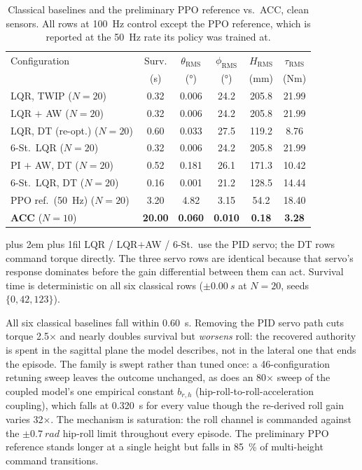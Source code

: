 \documentclass{jcd}
\newcommand{\tabnote}{\par\leftskip=0pt\rightskip=0pt plus 2em%
  \parfillskip=0pt plus 1fil\relax}
\begin{document}
\begin{table}[htbp]
\centering
\footnotesize
\caption{Classical baselines and the preliminary PPO reference vs.\ ACC, clean sensors. All rows at \SI{100}{Hz} control except the PPO reference, which is reported at the \SI{50}{Hz} rate its policy was trained at.}
\label{tab:lqr_baselines}
\setlength{\tabcolsep}{4pt}
\begin{tabular}{@{}l S[table-format=2.2] S[table-format=1.3] S[table-format=2.2] S[table-format=3.1] S[table-format=2.2]@{}}
\toprule
Configuration & {Surv.} & {$\theta_{\text{RMS}}$} & {$\phi_{\text{RMS}}$} & {$H_{\text{RMS}}$} & {$\tau_{\text{RMS}}$} \\
& {(s)} & {(\si{\degree})} & {(\si{\degree})} & {(mm)} & {(Nm)} \\
\midrule
LQR, TWIP ($N{=}20$)         & 0.32 & 0.006 & 24.2 & 205.8 & 21.99 \\
LQR $+$ AW ($N{=}20$)        & 0.32 & 0.006 & 24.2 & 205.8 & 21.99 \\
LQR, DT (re-opt.) ($N{=}20$) & 0.60 & 0.033 & 27.5 & 119.2 & 8.76 \\
6-St.\ LQR ($N{=}20$)        & 0.32 & 0.006 & 24.2 & 205.8 & 21.99 \\
PI $+$ AW, DT ($N{=}20$)     & 0.52 & 0.181 & 26.1 & 171.3 & 10.42 \\
6-St.\ LQR, DT ($N{=}20$)    & 0.16 & 0.001 & 21.2 & 128.5 & 14.44 \\
PPO ref.\ (\SI{50}{Hz}) ($N{=}20$)& 3.20 & 4.82  & 3.15 & 54.2  & 18.40 \\
\midrule
\textbf{ACC} ($N{=}10$)      & \bfseries 20.00 & \bfseries 0.060 & \bfseries 0.010 & \bfseries 0.18 & \bfseries 3.28 \\
\bottomrule
\end{tabular}
\vspace{3pt}\tabnote\noindent
LQR / LQR$+$AW / 6-St.\ use the PID servo; the DT rows command torque directly.
The three servo rows are identical because that servo's response dominates
before the gain differential between them can act. Survival time is
deterministic on all six classical rows ($\pm\SI{0.00}{s}$ at $N{=}20$, seeds
$\{0,42,123\}$).
\end{table}

All six classical baselines fall within \SI{0.60}{s}. Removing the PID servo
path cuts torque \num{2.5}$\times$ and nearly doubles survival but \emph{worsens}
roll: the recovered authority is spent in the sagittal plane the model describes,
not in the lateral one that ends the episode. The family is swept rather than
tuned once: a \num{46}-configuration retuning sweep leaves the outcome
unchanged, as does an \num{80}$\times$ sweep of the coupled model's one
empirical constant $b_{r,h}$ (hip-roll-to-roll-acceleration coupling), which
falls at \SI{0.320}{s} for every value though the re-derived roll gain varies
\num{32}$\times$. The mechanism is saturation: the roll channel is commanded against the $\pm\SI{0.7}{rad}$ hip-roll limit throughout every episode. The
preliminary PPO reference stands longer at a single height but falls in
\SI{85}{\percent} of multi-height command transitions.
\end{document}
